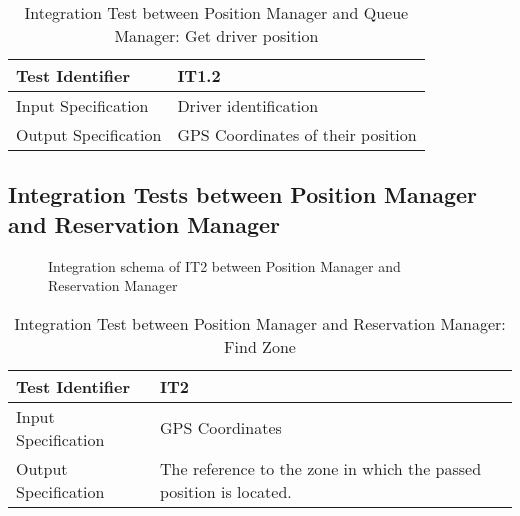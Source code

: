 \documentclass[a4paper]{article}
\begin{document}
\begin{table} [H]
\begin{center}
\begin{tabular}{| L | p{\rightcol} |}
  \hline
  Test Identifier & IT1.2 \\
  \hline
  Input Specification & Driver identification\\
  \hline
  Output Specification & GPS Coordinates of their position\\
  \hline
\end{tabular}
\end{center}
\caption{Integration Test between Position Manager and Queue Manager: Get driver position}
\end{table}

\subsection{Integration Tests between Position Manager and Reservation Manager}

\begin{figure} [H]
\caption{Integration schema of IT2 between Position Manager and Reservation Manager}
\end{figure}

\begin{table} [H]
\begin{center}
\begin{tabular}{| L | p{\rightcol} |}
  \hline
  Test Identifier & IT2 \\
  \hline
  Input Specification & GPS Coordinates\\
  \hline
  Output Specification & The reference to the zone in which the passed position is located.\\
  \hline
\end{tabular}
\end{center}
\caption{Integration Test between Position Manager and Reservation Manager: Find Zone}
\end{table}
\end{document}
